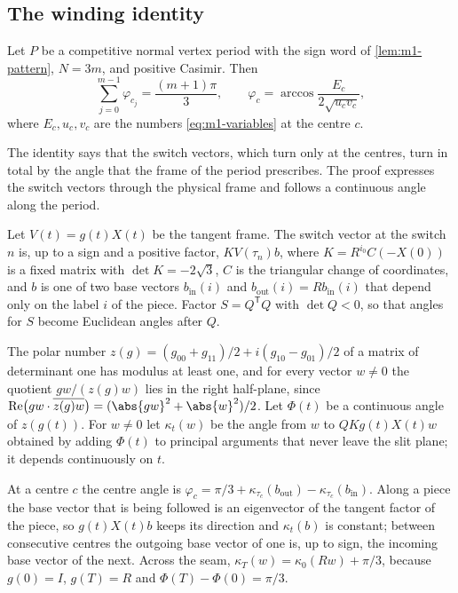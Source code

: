 \subsection{The winding identity}

\begin{proposition}\label{prop:m1-winding}
  Let $P$ be a competitive normal vertex period with the sign word of \cref{lem:m1-pattern}, $N=3m$,
  and positive Casimir. Then
  \[
    \sum_{j=0}^{m-1}\varphi_{c_j}=\frac{(m+1)\pi}3,\qquad
    \varphi_c=\arccos\frac{E_c}{2\sqrt{u_cv_c}},
  \]
  where $E_c,u_c,v_c$ are the numbers \eqref{eq:m1-variables} at the centre $c$.
\end{proposition}

The identity says that the switch vectors, which turn only at the centres, turn in total by the
angle that the frame of the period prescribes. The proof expresses the switch vectors through the
physical frame and follows a continuous angle along the period.

 Let $V(t)=g(t)X(t)$ be the tangent frame. The
switch vector at the switch $n$ is, up to a sign and a positive factor, $KV(\tau_n)b$, where
$K=R^{i_0}C(-X(0))$ is a fixed matrix with $\det K=-2\sqrt3$, $C$ is the triangular change of
coordinates, and $b$ is one of two base vectors $b_{\mathrm{in}}(i)$ and
$b_{\mathrm{out}}(i)=Rb_{\mathrm{in}}(i)$ that depend only on the label $i$ of the piece. Factor
$S=Q^{\mathsf T}Q$ with $\det Q<0$, so that angles for $S$ become Euclidean angles after $Q$.

 The polar number $z(g)=(g_{00}+g_{11})/2+i(g_{10}-g_{01})/2$ of a
matrix of determinant one has modulus at least one, and for every vector $w\ne0$ the quotient
$gw/(z(g)w)$ lies in the right half-plane, since
$\operatorname{Re}\bigl(gw\cdot\overline{z(g)w}\bigr)=(\abs{gw}^2+\abs{w}^2)/2$. Let $\Phi(t)$ be a
continuous angle of $z(g(t))$. For $w\ne0$ let $\kappa_t(w)$ be the angle from $w$ to
$QKg(t)X(t)w$ obtained by adding $\Phi(t)$ to principal arguments that never leave the slit
plane; it depends continuously on $t$.

 At a centre $c$ the centre angle is
$\varphi_c=\pi/3+\kappa_{\tau_c}(b_{\mathrm{out}})-\kappa_{\tau_c}(b_{\mathrm{in}})$. Along a piece
the base vector that is being followed is an eigenvector of the tangent factor of the piece, so
$g(t)X(t)b$ keeps its direction and $\kappa_t(b)$ is constant; between consecutive centres the
outgoing base vector of one is, up to sign, the incoming base vector of the next. Across the
seam, $\kappa_T(w)=\kappa_0(Rw)+\pi/3$, because $g(0)=I$, $g(T)=R$ and $\Phi(T)-\Phi(0)=\pi/3$.

